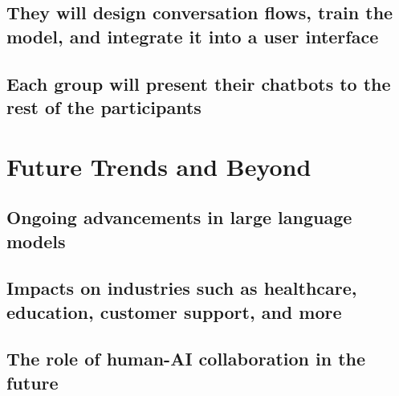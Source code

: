 \documentclass[
]{book}
\begin{document}
\hypertarget{they-will-design-conversation-flows-train-the-model-and-integrate-it-into-a-user-interface}{%
\section*{They will design conversation flows, train the model, and integrate it into a user interface}\label{they-will-design-conversation-flows-train-the-model-and-integrate-it-into-a-user-interface}}

\hypertarget{each-group-will-present-their-chatbots-to-the-rest-of-the-participants}{%
\section*{Each group will present their chatbots to the rest of the participants}\label{each-group-will-present-their-chatbots-to-the-rest-of-the-participants}}

\hypertarget{future-trends-and-beyond}{%
\chapter*{Future Trends and Beyond}\label{future-trends-and-beyond}}

\hypertarget{ongoing-advancements-in-large-language-models}{%
\section*{Ongoing advancements in large language models}\label{ongoing-advancements-in-large-language-models}}

\hypertarget{impacts-on-industries-such-as-healthcare-education-customer-support-and-more}{%
\section*{Impacts on industries such as healthcare, education, customer support, and more}\label{impacts-on-industries-such-as-healthcare-education-customer-support-and-more}}

\hypertarget{the-role-of-human-ai-collaboration-in-the-future}{%
\section*{The role of human-AI collaboration in the future}\label{the-role-of-human-ai-collaboration-in-the-future}}
\end{document}

